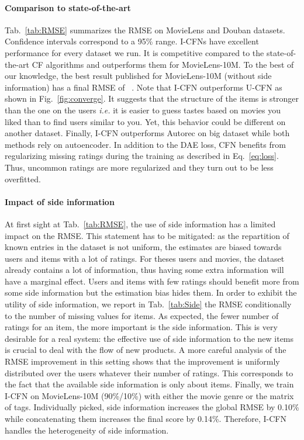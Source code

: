 \documentclass{article}
\begin{document}
\paragraph{Comparison to state-of-the-art}
Tab.~\ref{tab:RMSE} summarizes the RMSE on MovieLens and Douban datasets. Confidence intervals correspond to a 95\% range. I-CFNs have excellent performance for every dataset we run. It is competitive compared to the state-of-the-art CF algorithms and outperforms them for MovieLens-10M. To the best of our knowledge, the best result published for MovieLens-10M (without side information) has a final RMSE of ~\cite{Li2016}. Note that I-CFN outperforms U-CFN as shown in Fig.~\ref{fig:converge}. It suggests that the structure of the items is stronger than the one on the users \textit{i.e.} it is easier to guess tastes based on movies you liked than to find users similar to you. Yet, this behavior could be different on another dataset. Finally, I-CFN outperforms Autorec on big dataset while both methods rely on autoencoder. In addition to the DAE loss, CFN benefits from regularizing missing ratings during the training as described in Eq.~\ref{eq:loss}. Thus, uncommon ratings are more regularized and they turn out to be less overfitted.
\vspace{-0.5em}
\paragraph{Impact of side information}
At first sight at Tab.~\ref{tab:RMSE}, the use of side information has a limited impact on the RMSE. This statement has to be mitigated: as the repartition of known entries in the dataset is not uniform, the estimates are biased towards users and items with a lot of ratings. For theses users and movies, the dataset already contains a lot of information, thus having some extra information will have a marginal effect. Users and items with few ratings should benefit more from some side information but the estimation bias hides them. 
In order to exhibit the utility of side information, we report in Tab.~\ref{tab:Side} the RMSE conditionally to the number of missing values for items. As expected, the fewer number of ratings for an item, the more important is the side information. This is very desirable for a real system: the effective use of side information to the new items is crucial to deal with the flow of new products. A more careful analysis of the RMSE improvement in this setting shows that the improvement is uniformly distributed over the users whatever their number of ratings. This corresponds to the fact that the available side information is only about items. Finally, we train I-CFN on MovieLens-10M (90\%/10\%) with either the movie genre or the matrix of tags. Individually picked, side information increases the global RMSE by 0.10\% while concatenating them increases the final score by 0.14\%. Therefore, I-CFN handles the heterogeneity of side information.
\end{document}

